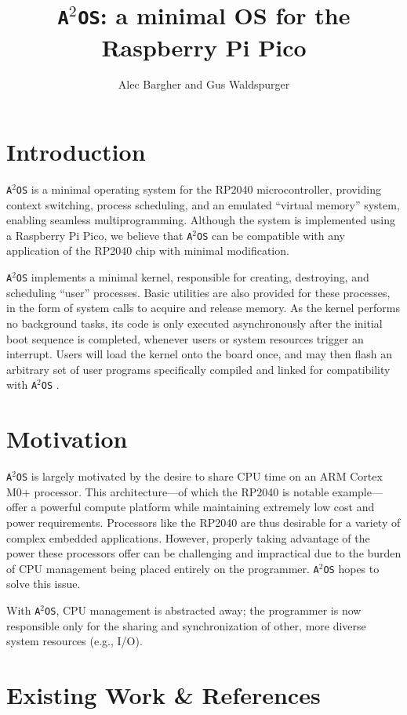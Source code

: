 \documentclass[12pt]{article}
\title{\texttt{A$^2$OS}: a minimal OS for the Raspberry Pi Pico}
\author{Alec Bargher and Gus Waldspurger}
\date{}
\newcommand{\os}{\texttt{A$^2$OS} }
\newcommand{\osns}{\texttt{A$^2$OS}}
\begin{document}
\maketitle

\section{Introduction}
\os is a minimal operating system for the RP2040 microcontroller, providing
context switching, process scheduling, and an emulated ``virtual memory''
system, enabling seamless multiprogramming.
Although the system is implemented using a Raspberry Pi Pico, we believe that
\os can be compatible with any application of the RP2040 chip with minimal
modification.

\vspace{.5em}

\os implements a minimal kernel, responsible for creating, destroying, and
scheduling ``user'' processes. Basic utilities are also provided for these
processes, in the form of system calls to acquire and release memory. As the
kernel performs no background tasks, its code is only executed asynchronously
after the initial boot sequence is completed, whenever users or system resources
trigger an interrupt. Users will load the kernel onto the board once, and may
then flash an arbitrary set of user programs specifically compiled and linked
for compatibility with \os.

\section{Motivation}

\os is largely motivated by the desire to share CPU time on an ARM Cortex M0+
processor. This architecture---of which the RP2040 is notable example---offer a
powerful compute platform while maintaining extremely low cost and power
requirements. Processors like the RP2040 are thus desirable for a variety of
complex embedded applications. However, properly taking advantage of the
power these processors offer can be challenging and impractical due to the
burden of CPU management being placed entirely on the programmer. \os hopes to
solve this issue.

With \osns, CPU management is abstracted away; the programmer is now responsible
only for the sharing and synchronization of other, more diverse system
resources (e.g., I/O).

\section{Existing Work \& References}
\end{document}
